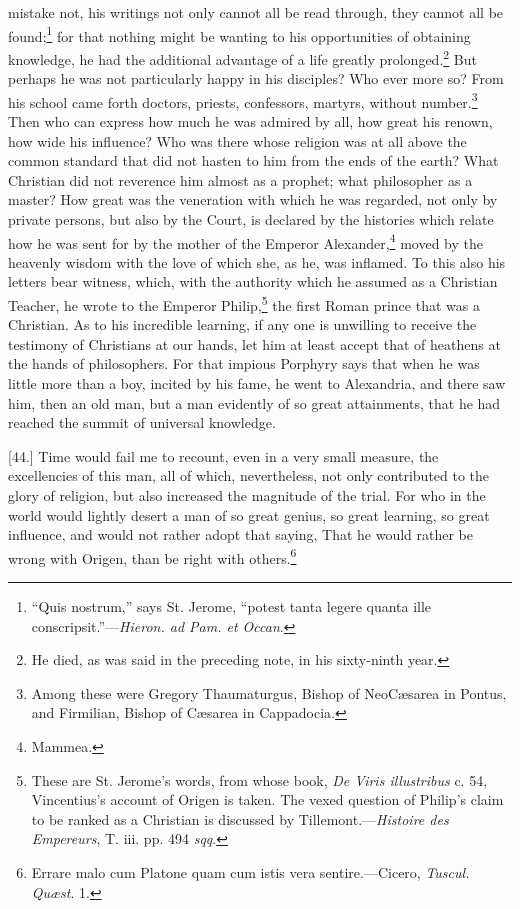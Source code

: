 mistake not, his writings not only cannot all be read through, they cannot all be found;\footnote{“Quis nostrum,” says St. Jerome, “potest tanta legere quanta ille conscripsit.”—\emph{Hieron. ad Pam. et Occan}.} for that nothing might be wanting to his opportunities of obtaining knowledge, he had the additional advantage of a life greatly prolonged.\footnote{He died, as was said in the preceding note, in his sixty-ninth year.} But perhaps he was not particularly happy in his disciples? Who ever more so? From his school came forth doctors, priests, confessors, martyrs, without number.\footnote{Among these were Gregory Thaumaturgus, Bishop of NeoCæsarea in Pontus, and Firmilian, Bishop of Cæsarea in Cappadocia.} Then who can express how much he was admired by all, how great his renown, how wide his influence? Who was there whose religion was at all above the common standard that did not hasten to him from the ends of the earth? What Christian did not reverence him almost as a prophet; what philosopher as a master? How great was the veneration with which he was regarded, not only by private persons, but also by the Court, is declared by the histories which relate how he was sent for by the mother of the Emperor Alexander,\footnote{Mammea.} moved by the heavenly wisdom with the love of which she, as he, was inflamed. To this also his letters bear witness, which, with the authority which he assumed as a Christian Teacher, he wrote to the Emperor Philip,\footnote{These are St. Jerome’s words, from whose book, \emph{De Viris illustribus} c. 54, Vincentius’s account of Origen is taken. The vexed question of Philip’s claim to be ranked as a Christian is discussed by Tillemont.—\emph{Histoire des Empereurs}, T. iii. pp. 494 \emph{sqq}.} the first Roman prince that was a Christian. As to his incredible learning, if any one is unwilling to receive the testimony of Christians at our hands, let him at least accept that of heathens at the hands of philosophers. For that impious Porphyry says that when he was little more than a boy, incited by his fame, he went to Alexandria, and there saw him, then an old man, but a man evidently of so great attainments, that he had reached the summit of universal knowledge.

[44.] Time would fail me to recount, even in a very small measure, the excellencies of this man, all of which, nevertheless, not only contributed to the glory of religion, but also increased the magnitude of the trial. For who in the world would lightly desert a man of so great genius, so great learning, so great influence, and would not rather adopt that saying, That he would rather be wrong with Origen, than be right with others.\footnote{Errare malo cum Platone quam cum istis vera sentire.—Cicero, \emph{Tuscul. Quæst}. 1.}

